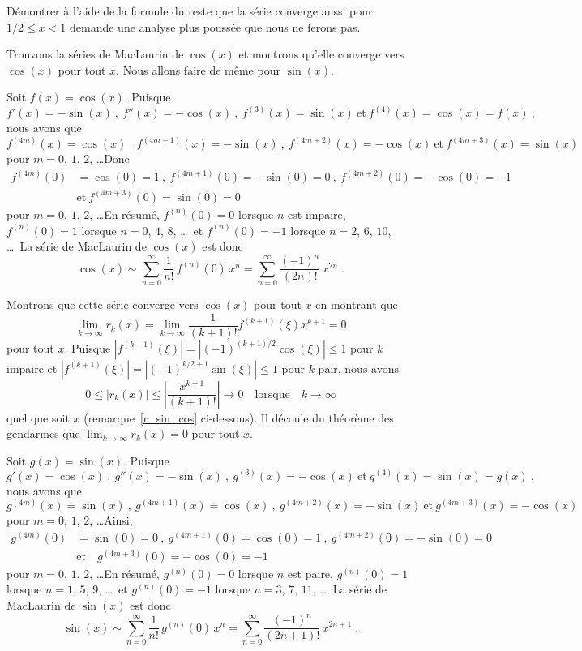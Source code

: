 {\begin{egg}
Démontrer à l'aide de la formule du reste que la série converge aussi pour
$1/2 \leq x <1$ demande une analyse plus poussée que nous ne ferons pas.
\end{egg}

\begin{egg}
Trouvons la séries de MacLaurin de $\cos(x)$ et montrons qu'elle
converge vers $\cos(x)$ pour tout $x$.  Nous allons faire de même pour
$\sin(x)$.

 Soit $f(x) = \cos(x)$.  Puisque
\[
f'(x) = -\sin(x) \ , \ f''(x) = -\cos(x) \ , \ f^{(3)}(x) =
\sin(x) \ \text{et} \ f^{(4)}(x) = \cos(x) = f(x) \ ,
\]
nous avons que
\[
f^{(4m)}(x) = \cos(x) \ , \ f^{(4m+1)}(x) = -\sin(x) \ , \ 
f^{(4m+2)}(x) = -\cos(x) \ \text{et} \ f^{(4m+3)}(x) = \sin(x)
\]
pour $m=0$, $1$, $2$, \ldots\quad  Donc
\begin{align*}
f^{(4m)}(0) &= \cos(0) = 1 \ , \ f^{(4m+1)}(0) = -\sin(0) = 0 \ , \ 
f^{(4m+2)}(0) = -\cos(0) = -1 \\
&\text{et} \ f^{(4m+3)}(0) = \sin(0) = 0
\end{align*}
pour $m=0$, $1$, $2$, \ldots\quad  En résumé, $f^{(n)}(0) = 0$ lorsque $n$ est
impaire, $f^{(n)}(0) = 1$ lorsque $n=0$, $4$, $8$, \ldots \  et
$f^{(n)}(0) = -1$ lorsque $n=2$, $6$, $10$, \ldots \  La série de MacLaurin
de $\cos(x)$ est donc
\[
\cos(x) \sim \sum_{n=0}^\infty \frac{1}{n!}\,f^{(n)}(0) \, x^n
= \sum_{n=0}^\infty \frac{(-1)^n}{(2n)!} \, x^{2n} \; .
\]

Montrons que cette série converge vers $\cos(x)$ pour tout $x$ en
montrant que
\[
\lim_{k\rightarrow \infty} r_k(x) =
\lim_{k\rightarrow \infty}
\frac{1}{(k+1)!} f^{(k+1)}(\xi) x^{k+1} = 0
\]
pour tout $x$.  Puisque
$\displaystyle \left| f^{(k+1)}(\xi) \right|
= \left| (-1)^{(k+1)/2} \cos(\xi) \right| \leq 1$ pour $k$ impaire et
$\displaystyle \left| f^{(k+1)}(\xi) \right|
= \left| (-1)^{k/2+1} \sin(\xi) \right| \leq 1$ pour $k$ pair, nous avons
\[
0 \leq \left| r_k(x) \right| \leq \left| \frac{x^{k+1}}{(k+1)!} \right|
\rightarrow 0 \quad \text{lorsque} \quad k \rightarrow \infty
\]
quel que soit $x$ (remarque~\ref{r_sin_cos} ci-dessous).  Il
découle du théorème des gendarmes que
$\displaystyle \lim_{k\rightarrow \infty} r_k(x) = 0$ pour tout $x$.

\subQ{ii} Soit $g(x) = \sin(x)$.  Puisque
\[
g'(x) = \cos(x) \ , \ g''(x) = -\sin(x) \ , \ g^{(3)}(x) = -\cos(x) \ 
\text{et} \ g^{(4)}(x) = \sin(x) = g(x) \ , 
\]
nous avons que
\[
g^{(4m)}(x) = \sin(x) \ , \ g^{(4m+1)}(x) = \cos(x) \ , \ g^{(4m+2)}(x) =
-\sin(x) \ \text{et} \ g^{(4m+3)}(x) = -\cos(x)
\]
pour $m=0$, $1$, $2$, \ldots\quad  Ainsi,
\begin{align*}
g^{(4m)}(0) &= \sin(0) = 0 \ , \ g^{(4m+1)}(0) = \cos(0) = 1 \ , \ 
g^{(4m+2)}(0) = -\sin(0) = 0 \\ 
&\text{et} \quad
g^{(4m+3)}(0) = -\cos(0) = -1
\end{align*}
pour $m=0$, $1$, $2$, \ldots\quad  En résumé, $g^{(n)}(0) = 0$ lorsque $n$ est
paire, $g^{(n)}(0) = 1$ lorsque $n=1$, $5$, $9$, \ldots \ et
$g^{(n)}(0) = -1$ lorsque $n=3$, $7$, $11$, \ldots \  La série de MacLaurin
de $\sin(x)$ est donc
\[
\sin(x) \sim \sum_{n=0}^\infty \frac{1}{n!}\,g^{(n)}(0) \, x^n
= \sum_{n=0}^\infty \frac{(-1)^n}{(2n+1)!}\, x^{2n+1} \; .
\]


\end{egg}}

